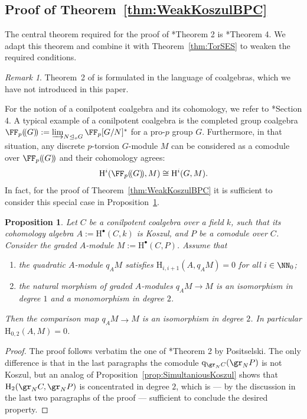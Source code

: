 \documentclass{amsart}
\newtheorem{prop}[thm]{Proposition}
\theoremstyle{definition}
\theoremstyle{remark}
\newtheorem{rem}[thm]{Remark}
\newcommand{\rmH}{\mathrm{H}}
\numberwithin{equation}{section}
\begin{document}
\subsection{Proof of Theorem~\ref{thm:WeakKoszulBPC}}
The central theorem required for the proof of \cite{Positselski2005}*{Theorem 2} is \cite{Positselski2005}*{Theorem 4}. We adapt this theorem and combine it with Theorem~\ref{thm:TorSES} to weaken the required conditions. 
\begin{rem}
\label{rem:Conilpotent group algebra}
    Theorem~2 of \cite{Positselski2005} is formulated in the language of coalgebras, which we have not introduced in this paper.

    For the notion of a conilpotent coalgebra and its cohomology, we refer to \cite{Positselski2005}*{Section 4}. A typical example of a conilpotent coalgebra is the completed group coalgebra $\FF_p(\!(G)\!):=\varinjlim_{N\unlhd_oG} \FF_p[G/N]^*$ for a pro-$p$ group $G$. Furthermore, in that situation, any discrete $p$-torsion $G$-module $M$ can be considered as a comodule over $\FF_p(\!(G)\!)$ and their cohomology agrees:
    \begin{align*}
        \rmH^i(\FF_p(\!(G)\!),M)\cong \rmH^i(G,M).
    \end{align*}
    In fact, for the proof of Theorem~\ref{thm:WeakKoszulBPC} it is sufficient to consider this special case in Proposition~\ref{thm:conilpotent-coalgebras}.
\end{rem}


\begin{prop}
\label{thm:conilpotent-coalgebras}
    Let $C$ be a conilpotent coalgebra over a field $k$, such that its cohomology algebra $A:=\rmH^{\bullet}(C,k)$ is Koszul, and $P$ be a comodule over $C$. Consider the graded $A$-module $M:=\rmH^\bullet(C,P)$. Assume that
    \begin{enumerate}
        \item \label{ass:TorVanishingCondition} the quadratic $A$-module $q_AM$ satisfies $\rmH_{i,i+1}(A,q_AM)=0$ for all $i\in \NN_0$;
        \item \label{ass:IsoAndMonoCondition}the natural morphism of graded $A$-modules $q_AM\to M$ is an isomorphism in degree $1$ and a monomorphism in degree $2$.
    \end{enumerate}
    Then the comparison map $q_AM\to M$ is an isomorphism in degree $2$. In particular $\rmH_{0,2}(A,M)=0$.
\end{prop}
\begin{proof}
    The proof follows verbatim the one of \cite{Positselski2005}*{Theorem 2} by Positselski. The only difference is that in the last paragraphs the comodule ${\rm q}_{\gr_N C}(\gr_N P)$ is not Koszul, but an analog of Proposition~\ref{prop:SimultaniousKoszul} shows that $\rmH_{2}(\gr_N C,\gr_NP)$ is concentrated in degree $2$, which is --- by the discussion in the last two paragraphs of the proof --- sufficient to conclude the desired property.
\end{proof}
\end{document}

